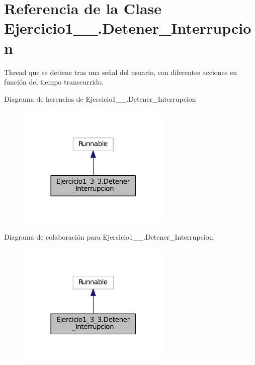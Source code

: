 \hypertarget{class_ejercicio1__3__3_1_1_detener___interrupcion}{}\section{Referencia de la Clase Ejercicio1\+\_\+\_.\+Detener\+\_\+\+Interrupcion}
\label{class_ejercicio1__3__3_1_1_detener___interrupcion}


Thread que se detiene tras una señal del usuario, con diferentes acciones en función del tiempo transcurrido.  




Diagrama de herencias de Ejercicio1\+\_\+\_.\+Detener\+\_\+\+Interrupcion
\nopagebreak
\begin{figure}[H]
\begin{center}
\leavevmode
\includegraphics[width=206pt]{class_ejercicio1__3__3_1_1_detener___interrupcion__inherit__graph}
\end{center}
\end{figure}


Diagrama de colaboración para Ejercicio1\+\_\+\_.\+Detener\+\_\+\+Interrupcion\+:
\nopagebreak
\begin{figure}[H]
\begin{center}
\leavevmode
\includegraphics[width=206pt]{class_ejercicio1__3__3_1_1_detener___interrupcion__coll__graph}
\end{center}
\end{figure}
